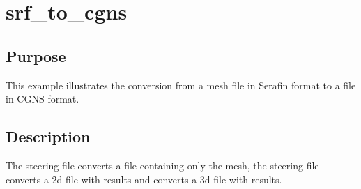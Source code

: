 \chapter{srf\_to\_cgns}
%
%
\section{Purpose}
This example illustrates the conversion from a mesh file in Serafin format to a
file in CGNS format.
%
\section{Description}
The steering file  converts a file
containing only the mesh, the steering file
 converts a 2d file with results
and  converts a 3d file with
results.
%
%
%
%
%
%
%
%

%

